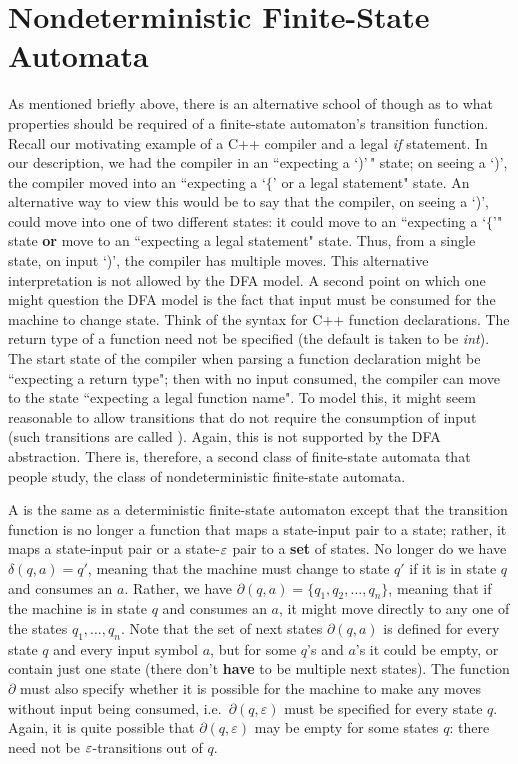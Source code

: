 \section{Nondeterministic Finite-State Automata}\label{S-fsa-2}

As mentioned briefly above, there is an alternative school of though as to what
properties should be required of a finite-state automaton's transition function.
Recall our motivating example of a C++ compiler and a legal {\em if} statement. 
In our description, we had the compiler in an ``expecting a `)'$\,$" state; on
seeing a `)', the compiler moved into an ``expecting a `$\{$' or a legal
statement" state.  An alternative way to view this would be to say that the
compiler, on seeing a `)', could move into one of two different states: it could
move to an ``expecting a `$\{$'" state {\bf or} move to an ``expecting a legal
statement" state. Thus, from a single state, on input `)', the compiler has
multiple moves.  This alternative interpretation is not
allowed by the DFA model.  A second point on which one 
might question the DFA model is the fact that input must be consumed for the
machine to change state.
Think of the syntax for C++ function declarations.  The return type of a
function need not be specified (the default is taken to be {\em int}).  The
start state of the compiler when parsing a function declaration might be 
``expecting a return type"; then with no
input consumed, the compiler can move to the state ``expecting a legal function 
name".  To model this, it might seem reasonable to allow transitions that do 
not require
the consumption of input (such transitions are called ).  
Again, this is not supported by the DFA abstraction.
There is, therefore, a second class of finite-state automata that people
study, the class of nondeterministic finite-state automata.  

\smallskip

A  is the same as a 
deterministic
finite-state automaton except that the transition function is no longer a
function that maps a state-input pair to a state; rather, it maps a state-input
pair or a state-$\varepsilon$ pair to a {\bf set} of states.  No longer do we have 
$\delta(q,a) = q'$, meaning that the machine
must change to state $q'$ if it is in state $q$ and consumes an $a$.  Rather,
we have $\partial(q,a) = \{q_1, q_2, \ldots, q_n\}$, meaning that if the
machine is in state $q$ and consumes an $a$, it might move directly to any one
of the states $q_1, \ldots, q_n$.  Note that the set of next states
$\partial(q,a)$ is defined for every state $q$ and every input symbol $a$,
but for some $q$'s and $a$'s it could be empty, or contain just one state (there
don't {\bf have} to be multiple next states).  The function $\partial$ must
also specify whether it is possible for the machine to make any moves 
without input being consumed, i.e.\ $\partial(q, \varepsilon)$ must be
specified for every state $q$.  Again, it is quite possible that 
$\partial(q, \varepsilon)$ may be empty for some states $q$: there need not be
$\varepsilon$-transitions out of $q$.

